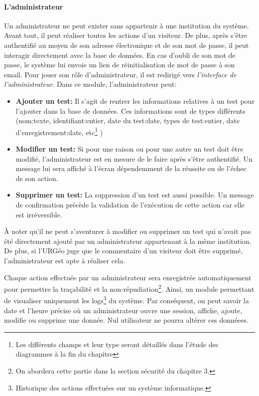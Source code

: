         \paragraph{L'administrateur}
        Un administrateur ne peut exister sans appartenir à une institution du système. Avant tout, il peut réaliser 
        toutes les actions d'un visiteur. De plus, après s'être authentifié au moyen de 
        son adresse électronique et de son mot de passe, il peut interagir directement avec la base de données. En cas 
        d'oubli de son mot de passe, le système lui envoie un lien de réinitialisation de mot de passe à son email.
        Pour jouer son rôle d'administrateur, il est redirigé vers \textit{l'interface de l'administrateur}. 
        Dans ce module, l'administrateur peut:
        \begin{itemize}
                \item \textbf{Ajouter un test: }
                Il s'agit de rentrer les informations relatives à un test pour l'ajouter dans la base de données.
                Ces informations sont de types différents (nom:texte, identifiant:entier, date du test:date, types
                de test:entier, date d'enregistrement:date, etc\footnote{Les différents champs et leur type seront 
                détaillés dans l'étude des diagrammes à la fin du chapitre} )
                \item \textbf{Modifier un test: }
                Si pour une raison ou pour une autre un test doit être modifié, l'administrateur est en
                mesure de le faire après s'être authentifié. Un message lui sera affiché à l'écran dépendemment 
                de la réussite ou de l'échec de son action. 
                \item \textbf{Supprimer un test: }
                La suppression d'un test est aussi possible. Un message de confirmation précède la validation
                de l'exécution de cette action car elle est irréversible.
        \end{itemize}
        \par
        À noter qu'il ne peut s'aventurer à modifier ou supprimer un test qui n'avait pas été directement 
        ajouté par un administrateur appartenant à la même institution. De plus, si l'URGéo juge que le commentaire d'un visiteur doit être supprimé,
        l'administrateur est apte à réaliser cela.
        \par
        Chaque action effectuée par un administrateur sera enregistrée automatiquement pour permettre la traçabilité
        et la non-répudiation\footnote{On abordera cette partie dans la section sécurité du chapitre 3.}.
        Ainsi, un module permettant de visualiser uniquement les logs\footnote{Historique des actions effectuées sur un 
        système informatique.} du système. Par conséquent, on peut savoir
        la date et l'heure précise où un administrateur ouvre une session, affiche, ajoute, modifie ou supprime une donnée.
        Nul utilisateur ne pourra altérer ces donnéees.
        \par


